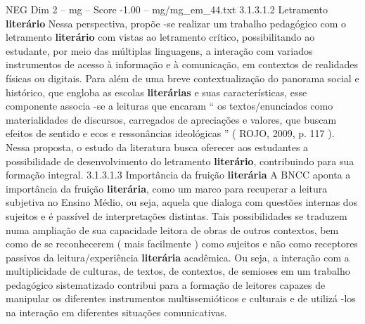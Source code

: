 \begin{textsample}{NEG Dim 2 – mg – Score -1.00 – mg/mg\_em\_44.txt}  \label{ex:f2_neg_099}
3.1.3.1.2 Letramento \textbf{literário} Nessa perspectiva, propõe -se realizar um trabalho pedagógico com o letramento \textbf{literário} com vistas ao letramento crítico, possibilitando ao estudante, por meio das múltiplas linguagens, a interação com variados instrumentos de acesso à informação e à comunicação, em contextos de realidades físicas ou digitais.
Para além de uma breve contextualização do panorama social e histórico, que engloba as escolas \textbf{literárias} e suas características, esse componente associa -se a leituras que encaram “ os textos/enunciados como materialidades de discursos, carregados de apreciações e valores, que buscam efeitos de sentido e ecos e ressonâncias ideológicas ” ( ROJO, 2009, p. 117 ).
Nessa proposta, o estudo da literatura busca oferecer aos estudantes a possibilidade de desenvolvimento do letramento \textbf{literário}, contribuindo para sua formação integral. 3.1.3.1.3 Importância da fruição \textbf{literária} A BNCC aponta a importância da fruição \textbf{literária}, como um marco para recuperar a leitura subjetiva no Ensino Médio, ou seja, aquela que dialoga com questões internas dos sujeitos e é passível de interpretações distintas.
Tais possibilidades se traduzem numa ampliação de sua capacidade leitora de obras de outros contextos, bem como de se reconhecerem ( mais facilmente ) como sujeitos e não como receptores passivos da leitura/experiência \textbf{literária} acadêmica.
Ou seja, a interação com a multiplicidade de culturas, de textos, de contextos, de semioses em um trabalho pedagógico sistematizado contribui para a formação de leitores capazes de manipular os diferentes instrumentos multissemióticos e culturais e de utilizá -los na interação em diferentes situações comunicativas.

\end{textsample}
